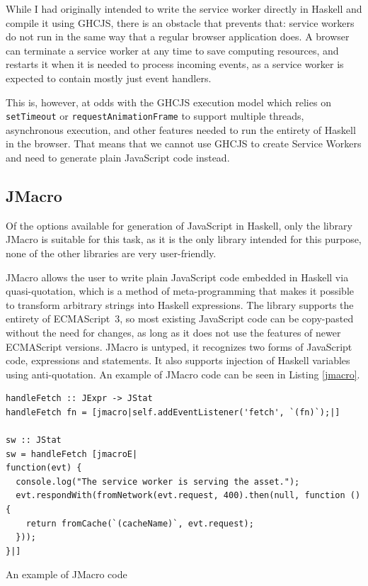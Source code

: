 \documentclass[english,zadani,odsaz]{fitthesis}
\begin{document}
While I had originally intended to write the service worker directly in Haskell
and compile it using GHCJS, there is an obstacle that prevents that: service
workers do not run in the same way that a regular browser application does. A
browser can terminate a service worker at any time to save computing resources,
and restarts it when it is needed to process incoming events, as a service
worker is expected to contain mostly just event handlers.

This is, however, at odds with the GHCJS execution model which relies on
\texttt{setTimeout} or \texttt{requestAnimationFrame} to support multiple threads, asynchronous
execution, and other features needed to run the entirety of Haskell in the
browser. That means that we cannot use GHCJS to create Service Workers and need
to generate plain JavaScript code instead.

\subsection{JMacro}
\label{sec:org3e14ecd}
Of the options available for generation of JavaScript in Haskell, only the
library JMacro is suitable for this task, as it is the only library intended for
this purpose, none of the other libraries are very user-friendly.

JMacro allows the user to write plain JavaScript code embedded in Haskell via
quasi-quotation, which is a method of meta-programming that makes it possible to
transform arbitrary strings into Haskell expressions. The library supports the
entirety of ECMAScript~3, so most existing JavaScript code can be
copy-pasted without the need for changes, as long as it does not use the
features of newer ECMAScript versions. JMacro is untyped, it recognizes two
forms of JavaScript code, expressions and statements. It also supports injection
of Haskell variables using anti-quotation. An example of JMacro code can be seen
in Listing \ref{jmacro}.

\begin{listing}[tb]
\begin{verbatim}
handleFetch :: JExpr -> JStat
handleFetch fn = [jmacro|self.addEventListener('fetch', `(fn)`);|]

sw :: JStat
sw = handleFetch [jmacroE|
function(evt) {
  console.log("The service worker is serving the asset.");
  evt.respondWith(fromNetwork(evt.request, 400).then(null, function () {
    return fromCache(`(cacheName)`, evt.request);
  }));
}|]
\end{verbatim}
\caption{An example of JMacro code \label{jmacro}}
\end{listing}
\end{document}
